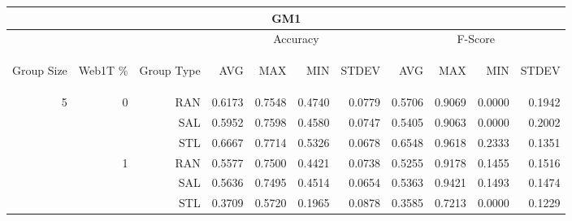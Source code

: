 \begin{center}
\begin{table}[htbp] 
 \begin{center}
\begin{tabular}{ | r | r | r | r | r | r | r | r | r | r | r |}
\hline
\multicolumn{11}{|c|}{GM1}\\
\hline
 & & & \multicolumn{4}{|c|}{Accuracy} & \multicolumn{4}{|c|}{F-Score}\\ \cline{4-11}
\begin{sideways}Group Size\end{sideways} & \begin{sideways}Web1T \%\end{sideways} & \begin{sideways}Group Type\end{sideways} & \begin{sideways}AVG\end{sideways} & \begin{sideways}MAX\end{sideways} & \begin{sideways}MIN\end{sideways} & \begin{sideways}STDEV\end{sideways} & \begin{sideways}AVG\end{sideways} & \begin{sideways}MAX\end{sideways} & \begin{sideways}MIN\end{sideways} & \begin{sideways}STDEV\end{sideways}\\
\hline
\multirow{18}{*}{5}
 & \multirow{3}{*}{0} & RAN & 0.6173 & 0.7548 & 0.4740 & 0.0779 & 0.5706 & 0.9069 & 0.0000 & 0.1942\\ \cline{3-11}
 &   & SAL & 0.5952 & 0.7598 & 0.4580 & 0.0747 & 0.5405 & 0.9063 & 0.0000 & 0.2002\\ \cline{3-11}
 &   & STL & 0.6667 & 0.7714 & 0.5326 & 0.0678 & 0.6548 & 0.9618 & 0.2333 & 0.1351\\ \cline{2-11}
 & \multirow{3}{*}{1} & RAN & 0.5577 & 0.7500 & 0.4421 & 0.0738 & 0.5255 & 0.9178 & 0.1455 & 0.1516\\ \cline{3-11}
 &   & SAL & 0.5636 & 0.7495 & 0.4514 & 0.0654 & 0.5363 & 0.9421 & 0.1493 & 0.1474\\ \cline{3-11}
 &   & STL & 0.3709 & 0.5720 & 0.1965 & 0.0878 & 0.3585 & 0.7213 & 0.0000 & 0.1229\\ \cline{2-11}

\end{tabular}
\end{center}
\end{table}
\end{center}
